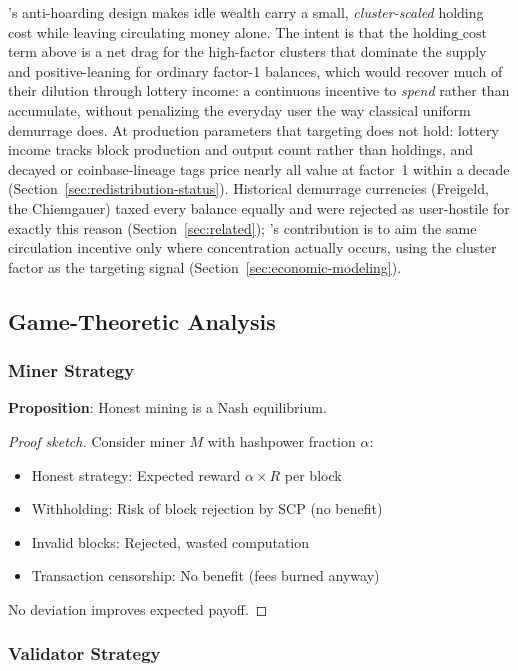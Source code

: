 \Botho's anti-hoarding design makes idle wealth carry a small,
\emph{cluster-scaled} holding cost while leaving circulating money alone. The
intent is that the $\text{holding\_cost}$ term above is a net drag for the
high-factor clusters that dominate the supply and positive-leaning for
ordinary factor-1 balances, which would recover much of their dilution
through lottery income: a continuous incentive to \emph{spend} rather than
accumulate, without penalizing the everyday user the way classical uniform
demurrage does. At production parameters that targeting does not hold:
lottery income tracks block production and output count rather than
holdings, and decayed or coinbase-lineage tags price nearly all value at
factor~1 within a decade (Section~\ref{sec:redistribution-status}). Historical demurrage currencies (Freigeld, the
Chiemgauer) taxed every balance equally and were rejected as user-hostile for
exactly this reason (Section~\ref{sec:related}); \Botho's contribution is to
aim the same circulation incentive only where concentration actually occurs,
using the cluster factor as the targeting signal
(Section~\ref{sec:economic-modeling}).

\subsection{Game-Theoretic Analysis}

\subsubsection{Miner Strategy}

\textbf{Proposition}: Honest mining is a Nash equilibrium.

\begin{proof}[Proof sketch]
Consider miner $M$ with hashpower fraction $\alpha$:
\begin{itemize}
  \item Honest strategy: Expected reward $\alpha \times R$ per block
  \item Withholding: Risk of block rejection by SCP (no benefit)
  \item Invalid blocks: Rejected, wasted computation
  \item Transaction censorship: No benefit (fees burned anyway)
\end{itemize}
No deviation improves expected payoff.
\end{proof}

\subsubsection{Validator Strategy}

